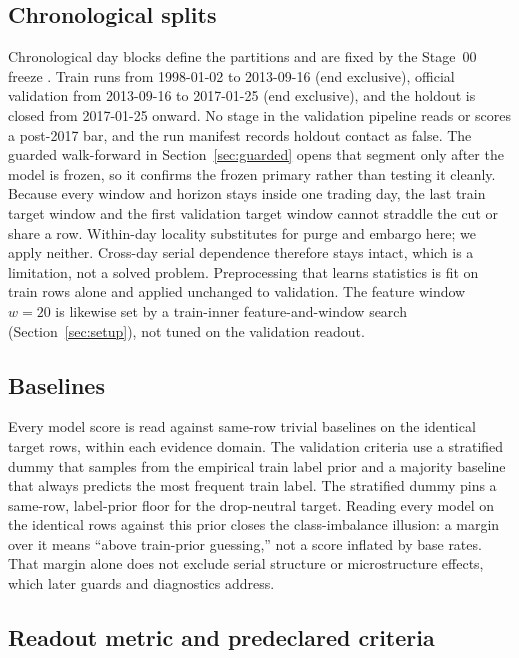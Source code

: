 \subsection{Chronological splits}

Chronological day blocks define the partitions and are fixed by the Stage~00
freeze \cite{hyndman2021forecasting}. Train runs from 1998-01-02 to 2013-09-16
(end exclusive), official validation from 2013-09-16 to 2017-01-25 (end
exclusive), and the holdout is closed from 2017-01-25 onward. No stage in the
validation pipeline reads or scores a post-2017 bar, and the run manifest records
holdout contact as false. The guarded walk-forward in
Section~\ref{sec:guarded} opens that segment only after the model is frozen, so
it confirms the frozen primary rather than testing it cleanly. Because every
window and horizon stays inside one trading day, the last train target window and
the first validation target window cannot straddle the cut or share a row. Within-day
locality substitutes for purge and embargo here; we apply neither. Cross-day serial
dependence therefore stays intact, which is a limitation, not a solved problem. Preprocessing that learns statistics is fit on
train rows alone and applied unchanged to validation. The feature window
\(w = 20\) is likewise set by a train-inner feature-and-window search
(Section~\ref{sec:setup}), not tuned on the validation readout.

\subsection{Baselines}

Every model score is read against same-row trivial baselines on the identical
target rows, within each evidence domain. The validation criteria use a
stratified dummy that samples from the empirical train label prior and a majority
baseline that always predicts the most frequent train label. The stratified dummy
pins a same-row, label-prior \macrofone{} floor for the drop-neutral target.
Reading every model on the identical rows against this prior closes the
class-imbalance illusion: a margin over it means ``above train-prior guessing,''
not a score inflated by base rates. That margin alone does not exclude serial structure or microstructure effects,
which later guards and diagnostics address.

\subsection{Readout metric and predeclared criteria}

